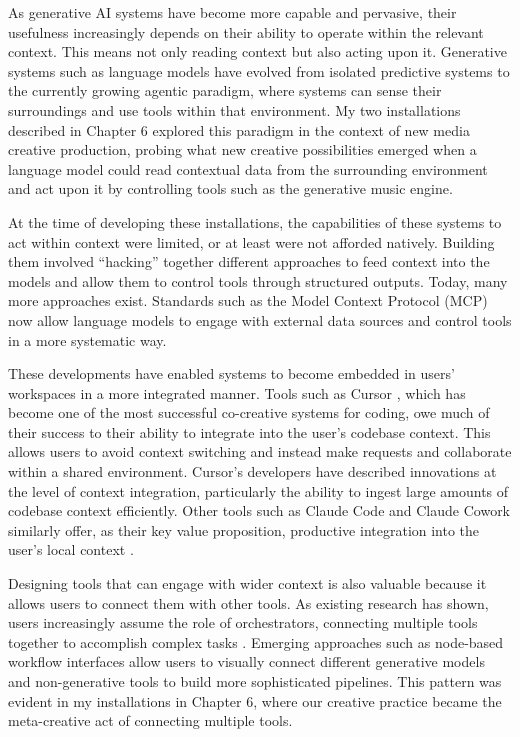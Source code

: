 As generative AI systems have become more capable and pervasive, their usefulness increasingly depends on their ability to operate within the relevant context. This means not only reading context but also acting upon it. Generative systems such as language models have evolved from isolated predictive systems to the currently growing agentic paradigm, where systems can sense their surroundings and use tools within that environment. My two installations described in Chapter 6 explored this paradigm in the context of new media creative production, probing what new creative possibilities emerged when a language model could read contextual data from the surrounding environment and act upon it by controlling tools such as the generative music engine.

At the time of developing these installations, the capabilities of these systems to act within context were limited, or at least were not afforded natively. Building them involved ``hacking'' together different approaches to feed context into the models and allow them to control tools through structured outputs. Today, many more approaches exist. Standards such as the Model Context Protocol (MCP) \citep{Anthropic2025-tg}now allow language models to engage with external data sources and control tools in a more systematic way.

These developments have enabled systems to become embedded in users' workspaces in a more integrated manner. Tools such as Cursor \citep{Cursor2024-ow}, which has become one of the most successful co-creative systems for coding, owe much of their success to their ability to integrate into the user's codebase context. This allows users to avoid context switching and instead make requests and collaborate within a shared environment. Cursor's developers have described innovations at the level of context integration, particularly the ability to ingest large amounts of codebase context efficiently. Other tools such as Claude Code and Claude Cowork similarly offer, as their key value proposition, productive integration into the user's local context \citep{Anthropic2025-lr}.

Designing tools that can engage with wider context is also valuable because it allows users to connect them with other tools. As existing research has shown, users increasingly assume the role of orchestrators, connecting multiple tools together to accomplish complex tasks \citep{Palani2024-on}. Emerging approaches such as node-based workflow interfaces allow users to visually connect different generative models and non-generative tools to build more sophisticated pipelines. This pattern was evident in my installations in Chapter 6, where our creative practice became the meta-creative act of connecting multiple tools.

